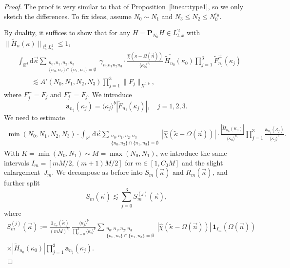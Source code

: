 \documentclass[11pt,reqno,english]{amsart}
\numberwithin{equation}{section}
\theoremstyle{plain}
\theoremstyle{definition}
\theoremstyle{remark}
\renewcommand{\epsilon}{\varepsilon}
\newcommand{\ov}{\overline}
\begin{document}
\begin{proof}
	The proof is very similar to that of Proposition~\ref{linear:type1}, so we only sketch the differences. To fix ideas, assume $N_0\sim N_1$ and $N_3\leq N_2\leq N_0^{\epsilon_0}$.

	By duality, it suffices to show that for any $H=\mathbf{P}_{N_0}H\in L_{t,x}^2$ with $\|\widetilde{H}_n(\kappa)\|_{\ell_n^2 L_{\kappa}^2}\leq 1$,
	\begin{align*}
		&\int_{\mathbb{R}^4}\mathrm{d}\vec{\kappa}\sum_{\substack{n_0,n_1,n_2,n_3\\
				\{n_0,n_2\}\cap \{n_1,n_3\}=\emptyset
		}}\gamma_{n_0 n_1 n_2 n_3}\cdot\frac{\widehat{\chi}(\widetilde{\kappa}-\Omega(\vec{n}))}{\langle\kappa_0\rangle^{b_1}}\,\ov{\widetilde{H}_{n_0}}(\kappa_0)\prod_{j=1}^3\widetilde{F}^{\pm}_{n_j}(\kappa_j) \\
		&\qquad\lesssim A'(N_0,N_1,N_2,N_3)\prod_{j=1}^3\|F_j\|_{X^{0,b}},
	\end{align*}
	where $F_j^+=F_j$ and $F_j^-=\ov{F}_j$.
	We introduce
	\[
	\mathbf{a}_{n_j}(\kappa_j)=\langle\kappa_j\rangle^b|\widetilde{F}_{n_j}(\kappa_j)|, \quad j=1,2,3.
	\]
	We need to estimate
	\begin{align*}
		\min(N_0,N_1,N_2,N_3)\cdot\int_{\mathbb{R}^4}\mathrm{d}\vec{\kappa}\sum_{\substack{n_0,n_1,n_2,n_3\\
				\{n_0,n_2\}\cap\{n_1,n_3\}=\emptyset
		}}|\widehat{\chi}(\widetilde{\kappa}-\Omega(\vec{n}))|\cdot\frac{|\widetilde{H}_{n_0}(\kappa_0)|}{\langle\kappa_0\rangle^{b_1}}\prod_{j=1}^3\frac{\mathbf{a}_{n_j}(\kappa_j)}{\langle\kappa_j\rangle^b}.
	\end{align*}
	With $K=\min(N_0,N_1)\sim M=\max(N_0,N_1)$, we introduce the same intervals $I_m=[mM/2, (m+1)M/2]$ for $m\in[1,C_0 M]$ and the slight enlargement~$J_m$. We decompose as before into $S_m(\vec{\kappa})$ and $R_m(\vec{\kappa})$, and further split
	\[
	S_m(\vec{\kappa})\lesssim \sum_{j=0}^3 S_m^{(j)}(\vec{\kappa}),
	\]
	where
\begin{multline*}
		S_m^{(j)}(\vec{\kappa}):=\frac{\mathbf{1}_{J_m}(\widetilde{\kappa})}{(mM)^{b_1}}\,\frac{\langle\kappa_j\rangle^b}{\prod_{i=0}^3 \langle\kappa_i\rangle^{b}}\!\!\!\!\sum_{\substack{n_0,n_1,n_2,n_3\\
				\{n_0,n_2\}\cap\{n_1,n_3\}=\emptyset
		}}\!\!\!\!
		|\widehat{\chi}(\widetilde{\kappa}-\Omega(\vec{n}))|\,\mathbf{1}_{I_m}(\Omega(\vec{n}))\\
		\times|\widetilde{H}_{n_0}(\kappa_0)|\prod_{j=1}^3\mathbf{a}_{n_j}(\kappa_j).
	\end{multline*}

\end{proof}
\end{document}
